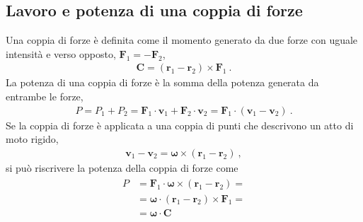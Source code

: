 \documentclass[letterpaper,10pt,english]{jupyterBook}
\begin{document}
\subsection{Lavoro e potenza di una coppia di forze}
\label{\detokenize{ch/actions-work-power:lavoro-e-potenza-di-una-coppia-di-forze}}
\sphinxAtStartPar
Una coppia di forze è definita come il momento generato da due forze con uguale intensità e verso opposto, \(\mathbf{F}_1 = - \mathbf{F}_2\),
\begin{equation*}
\begin{split}\mathbf{C} = (\mathbf{r}_1 - \mathbf{r}_2) \times \mathbf{F}_1 \ .\end{split}
\end{equation*}
\sphinxAtStartPar
{} La potenza di una coppia di forze è la somma della potenza generata da entrambe le forze,
\begin{equation*}
\begin{split}P = P_1 + P_2 = \mathbf{F}_1 \cdot \mathbf{v}_1 + \mathbf{F}_2 \cdot \mathbf{v}_2 = \mathbf{F}_1 \cdot (\mathbf{v}_1 - \mathbf{v}_2) \ .\end{split}
\end{equation*}
\sphinxAtStartPar
Se la coppia di forze è applicata a una coppia di punti che descrivono un atto di moto rigido,
\begin{equation*}
\begin{split}\mathbf{v}_1 - \mathbf{v}_2 = \symbf{\omega} \times (\mathbf{r}_1 - \mathbf{r}_2) \ ,\end{split}
\end{equation*}
\sphinxAtStartPar
si può riscrivere la potenza della coppia di forze come
\begin{equation*}
\begin{split}\begin{aligned}
P & = \mathbf{F}_1 \cdot \symbf{\omega} \times (\mathbf{r}_1 - \mathbf{r}_2) = \\
  & = \symbf{\omega} \cdot ( \mathbf{r}_1 - \mathbf{r}_2 ) \times \mathbf{F}_1 = \\
  & = \symbf{\omega} \cdot \mathbf{C}
\end {aligned}\end{split}
\end{equation*}
\sphinxstepscope
\end{document}
